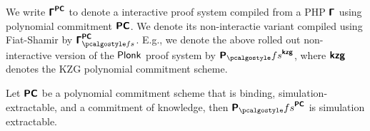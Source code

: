 \documentclass[runningheads,11pt]{llncs}
\begin{document}
We write $\bm{\mathsf{\Gamma}}^{\bm{\mathsf{PC}}}$ to denote a interactive proof system compiled from a PHP $\bm{\mathsf{\Gamma}}$ using
polynomial commitment $\bm{\mathsf{PC}}$. We denote its non-interactie variant compiled using Fiat-Shamir by $\PHP^{\PCOM}_{\fs}$. E.g., we denote the above rolled out non-interactive version of the
$\textnormal{\textsf{Plonk}}$ proof system by $\plonkprotfs^{\kzg}$, where $\bm{\mathsf{kzg}}$ denotes the KZG
polynomial commitment scheme.

\begin{theorem}
  Let $\bm{\mathsf{PC}}$ be a polynomial commitment scheme that is binding, simulation-extractable, and a commitment of knowledge,
  then $\plonkprotfs^{\PCOM}$ is simulation extractable.
\end{theorem}
\end{document}
